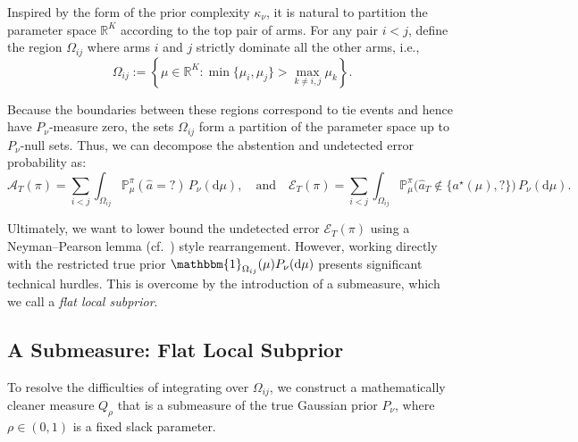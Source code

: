 \documentclass[10pt]{article}
\newcommand{\dd}{\mathrm{d}}
\theoremstyle{plain}
\begin{document}
Inspired by the form of the prior complexity $\kappa_\nu$, it is natural to partition the parameter space $\mathbb{R}^K$ according to the top pair of arms. For any pair $i < j$, define the region $\Omega_{ij}$ where arms $i$ and $j$ strictly dominate all the other arms, i.e., 
$$\Omega_{ij} := \left\{ \mu \in \mathbb{R}^K : \min\{\mu_i, \mu_j\}> \max_{k \neq i,j} \mu_k \right\}.$$

Because the boundaries between these regions correspond to tie events and hence have $P_\nu$-measure zero, the sets $\Omega_{ij}$ form a   partition of the parameter space up to \(P_\nu\)-null sets.  Thus, we can decompose the abstention and undetected error probability as:
$$\mathcal{A}_T(\pi) = \sum_{i<j} \int_{\Omega_{ij}} \mathbb{P}_\mu^\pi(\hat{a}=?)\,P_\nu(\dd\mu),\quad \mbox{and}\quad
\mathcal{E}_T(\pi) = \sum_{i<j} \int_{\Omega_{ij}} \mathbb{P}_\mu^\pi\bigl(\hat{a}_T \notin \{a^\star(\mu), ?\}\bigr)\,P_\nu(\dd\mu).$$

Ultimately, we want to lower bound the undetected error  $\mathcal{E}_T(\pi)$ using a Neyman--Pearson lemma (cf.\  \citet{testhypo2005}) style rearrangement. However, working directly with the restricted true prior $\mathbbm{1}_{\Omega_{ij}}(\mu)P_\nu(\dd\mu)$ presents significant technical hurdles.  This is overcome by the introduction of a submeasure,  which we call a {\em  flat local subprior}.  %




\subsection{A Submeasure: Flat Local Subprior}


To resolve the difficulties of integrating over $\Omega_{ij}$, we construct a mathematically cleaner  measure $Q_\rho$ that is a submeasure of the true Gaussian prior $P_\nu$, where $\rho \in (0,1)$ is a fixed slack parameter. %
\end{document}
